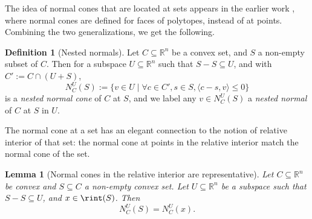 \documentclass{article}
\theoremstyle{plain}
\newtheorem{lemma}{Lemma}[section]
\theoremstyle{definition}
\newtheorem{definition}{Definition}[section]
\theoremstyle{remark}
\begin{document}
The idea of normal cones that are located at sets appears in the earlier work  
\cite{lu_NormalFansPolyhedral_2008}, where normal cones are defined for faces of
polytopes, instead of at points. 
Combining the two generalizations, we get the following.
\begin{definition}[Nested normals]
\label{loc:nested_normals.statement}
Let $C \subseteq \mathbb{R}^n$ be a convex set, and $S$ a
non-empty subset of $C$. Then for a subspace $U \subseteq \mathbb{R}^n$
such that $S-S \subseteq U$, and with $C' := C \cap (U + S)$,
\begin{equation*}
N_C^U(S) := \{v \in U \mid \forall c \in C', s \in S, \langle c-s, v\rangle \le 0\}
\end{equation*}
is a \emph{nested normal cone} of $C$ at $S$,
and we label any $v \in N_C^U(S)$
 a \emph{nested normal} of $C$ at $S$ in $U$.
\end{definition}
The normal cone at a set has an elegant
connection to the notion of relative interior of that set: the normal
cone at points in the relative interior match the normal cone of the set.
\begin{lemma}[Normal cones in the relative interior are representative]
\label{loc:normal_cones_in_the_relative_interior_are_representative.statement}
Let $C \subseteq \mathbb{R}^n$ be convex and $S \subseteq C$ a non-empty convex set.
Let $U \subseteq \mathbb{R}^n$ be a subspace such that $S-S \subseteq U$,
and $x \in \rint(S)$. Then
\begin{equation*}
N_C^U(S) = N_C^U(x).
\end{equation*}
\end{lemma}
\end{document}
